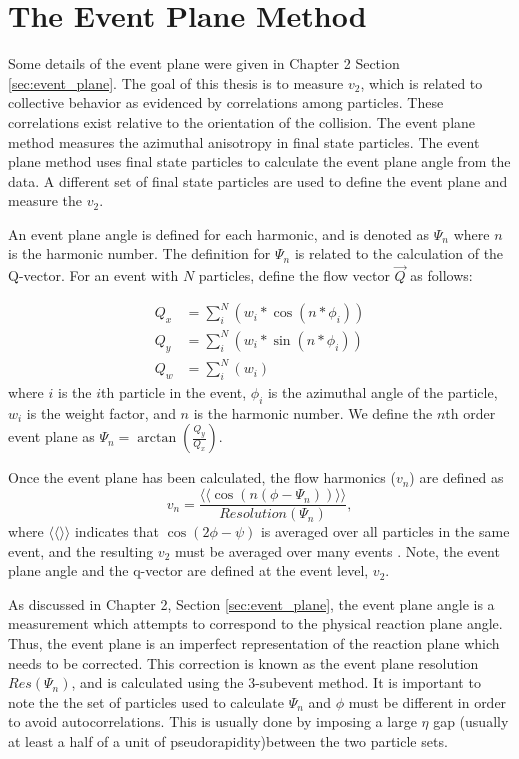 \section{The Event Plane Method}
Some details of the event plane were given in Chapter 2 Section \ref{sec:event_plane}.
The goal of this thesis is to measure $v_2$, which is related to collective behavior as evidenced by correlations among particles. These correlations exist relative to the orientation of the collision. The event plane method measures the azimuthal anisotropy in final state particles. The event plane method uses final state particles to calculate the event plane angle from the data. A different set of final state particles are used to define the event plane and measure the $v_2$. 

An event plane angle is defined for each harmonic, and is denoted as $\Psi_n$ where $n$ is the harmonic number. The definition for $\Psi_n$ is related to the calculation of the Q-vector. For an event with $N$ particles, define the flow vector $\vec{Q}$ as follows:

\begin{align}
Q_x &= \sum_i^{N}( w_i * \cos(n * \phi_i)) \\
Q_y &= \sum_i^{N}( w_i * \sin(n * \phi_i)) \\
Q_w &= \sum_i^{N}( w_i )
\label{eqn:general_ep_math}
\end{align}
where $i$ is the $i$th particle in the event, $\phi_i$ is the azimuthal angle of the particle, $w_i$ is the weight factor, and $n$ is the harmonic number. We define the $n$th order event plane as
$\Psi_n = \arctan \left( \frac{Q_y}{Q_x} \right). $

Once the event plane has been calculated, the flow harmonics ($v_n$) are defined as
\begin{equation}
v_n = \frac{\langle \langle\cos(n(\phi - \Psi_n))\rangle \rangle}{Resolution(\Psi_n)},
\end{equation}
where $\langle \langle \rangle \rangle$ indicates that $\cos(2\phi-\psi)$ is averaged over all particles in the same event, and the resulting $v_2$ must be averaged over many events \cite{PhysRevC.58.1671}. Note, the event plane angle and the q-vector are defined at the event level, $v_2$.
  
As discussed in Chapter 2, Section \ref{sec:event_plane}, the event plane angle is a measurement which attempts to correspond to the physical reaction plane angle. Thus, the event plane is an imperfect representation of the reaction plane which needs to be corrected. This correction is known as the event plane resolution $Res(\Psi_n)$, and is calculated using the 3-subevent method. It is important to note the the set of particles used to calculate $\Psi_n$ and $\phi$ must be different in order to avoid autocorrelations. This is usually done by imposing a large $\eta$ gap (usually at least a half of a unit of pseudorapidity)between the two particle sets.


